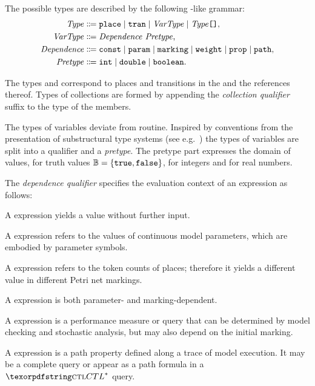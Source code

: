 The possible types are described by the following -like grammar:
\begin{equation}
  \begin{aligned}
    \ebnfVar{Type} &\ebnfEq \lit{place} \mid \lit{tran} \mid \ebnfVar{VarType} \mid \bagtype{\ebnfVar{Type}} \text, \\
    \ebnfVar{VarType} &\ebnfEq \vartype{\ebnfVar{Dependence}}{\ebnfVar{Pretype}} \text,\\
    \rel{Dependence} &\ebnfEq \lit{const} \mid \lit{param} \mid \lit{marking} \mid \lit{weight} \mid \lit{prop} \mid \lit{path} \text, \\
    \ebnfVar{Pretype} &\ebnfEq \lit{int} \mid \lit{double} \mid \lit{boolean} \text.
  \end{aligned} \label{eq:rgspn:type-ebnf}
\end{equation}

The types  and  correspond to places and transitions in the  and the references thereof. Types of collections are formed by appending the \emph{collection qualifier} suffix \lit{[]} to the type of the members.

The types of variables deviate from routine. Inspired by conventions from the presentation of substructural type systems (see e.g.~\cite{Walker05substructural}) the types of variables are split into a qualifier and a \emph{pretype}. The pretype part expresses the domain of values,  for truth values \(\mathbb{B} = \{\texttt{\upshape true}, \texttt{\upshape false}\}\),  for integers and  for real numbers.

The \emph{dependence qualifier} specifies the evaluation context of an expression as follows:
\begin{compactitem}
\item A  expression yields a value without further input.
\item A  expression refers to the values of continuous model parameters, which are embodied by parameter symbols.
\item A  expression refers to the token counts of places; therefore it yields a different value in different Petri net markings.
\item A  expression is both parameter- and marking-dependent.
\item A  expression is a performance measure or query that can be determined by model checking and stochastic analysis, but may also depend on the initial marking.
\item A  expression is a path property defined along a trace of model execution. It may be a complete  query or appear as a path formula in a \(\textabbr{CTL}^*\)  query.
\end{compactitem}

